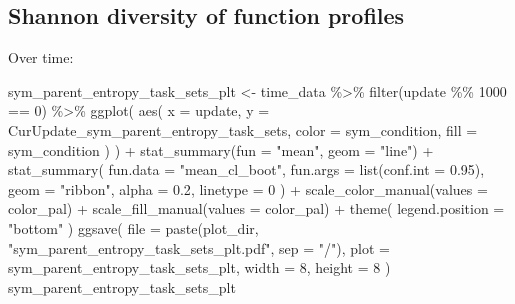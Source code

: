 \documentclass[
]{book}
\newenvironment{Shaded}{\begin{snugshade}}{\end{snugshade}}
\newcommand{\AttributeTok}[1]{\textcolor[rgb]{0.77,0.63,0.00}{#1}}
\newcommand{\DecValTok}[1]{\textcolor[rgb]{0.00,0.00,0.81}{#1}}
\newcommand{\FloatTok}[1]{\textcolor[rgb]{0.00,0.00,0.81}{#1}}
\newcommand{\FunctionTok}[1]{\textcolor[rgb]{0.00,0.00,0.00}{#1}}
\newcommand{\NormalTok}[1]{#1}
\newcommand{\OtherTok}[1]{\textcolor[rgb]{0.56,0.35,0.01}{#1}}
\newcommand{\SpecialCharTok}[1]{\textcolor[rgb]{0.00,0.00,0.00}{#1}}
\newcommand{\StringTok}[1]{\textcolor[rgb]{0.31,0.60,0.02}{#1}}
\begin{document}
\hypertarget{shannon-diversity-of-function-profiles-3}{%
\subsection{Shannon diversity of function profiles}\label{shannon-diversity-of-function-profiles-3}}

Over time:

\begin{Shaded}
\begin{Highlighting}[]
\NormalTok{sym\_parent\_entropy\_task\_sets\_plt }\OtherTok{\textless{}{-}}\NormalTok{ time\_data }\SpecialCharTok{\%\textgreater{}\%}
  \FunctionTok{filter}\NormalTok{(update }\SpecialCharTok{\%\%} \DecValTok{1000} \SpecialCharTok{==} \DecValTok{0}\NormalTok{) }\SpecialCharTok{\%\textgreater{}\%}
  \FunctionTok{ggplot}\NormalTok{(}
    \FunctionTok{aes}\NormalTok{(}
      \AttributeTok{x =}\NormalTok{ update,}
      \AttributeTok{y =}\NormalTok{ CurUpdate\_sym\_parent\_entropy\_task\_sets,}
      \AttributeTok{color =}\NormalTok{ sym\_condition,}
      \AttributeTok{fill =}\NormalTok{ sym\_condition}
\NormalTok{    )}
\NormalTok{  ) }\SpecialCharTok{+}
  \FunctionTok{stat\_summary}\NormalTok{(}\AttributeTok{fun =} \StringTok{"mean"}\NormalTok{, }\AttributeTok{geom =} \StringTok{"line"}\NormalTok{) }\SpecialCharTok{+}
  \FunctionTok{stat\_summary}\NormalTok{(}
    \AttributeTok{fun.data =} \StringTok{"mean\_cl\_boot"}\NormalTok{,}
    \AttributeTok{fun.args =} \FunctionTok{list}\NormalTok{(}\AttributeTok{conf.int =} \FloatTok{0.95}\NormalTok{),}
    \AttributeTok{geom =} \StringTok{"ribbon"}\NormalTok{,}
    \AttributeTok{alpha =} \FloatTok{0.2}\NormalTok{,}
    \AttributeTok{linetype =} \DecValTok{0}
\NormalTok{  ) }\SpecialCharTok{+}
  \FunctionTok{scale\_color\_manual}\NormalTok{(}\AttributeTok{values =}\NormalTok{ color\_pal) }\SpecialCharTok{+}
  \FunctionTok{scale\_fill\_manual}\NormalTok{(}\AttributeTok{values =}\NormalTok{ color\_pal) }\SpecialCharTok{+}
  \FunctionTok{theme}\NormalTok{(}
    \AttributeTok{legend.position =} \StringTok{"bottom"}
\NormalTok{  )}
\FunctionTok{ggsave}\NormalTok{(}
  \AttributeTok{file =} \FunctionTok{paste}\NormalTok{(plot\_dir, }\StringTok{"sym\_parent\_entropy\_task\_sets\_plt.pdf"}\NormalTok{, }\AttributeTok{sep =} \StringTok{"/"}\NormalTok{),}
  \AttributeTok{plot =}\NormalTok{ sym\_parent\_entropy\_task\_sets\_plt,}
  \AttributeTok{width =} \DecValTok{8}\NormalTok{,}
  \AttributeTok{height =} \DecValTok{8}
\NormalTok{)}
\NormalTok{sym\_parent\_entropy\_task\_sets\_plt}
\end{Highlighting}
\end{Shaded}
\end{document}
